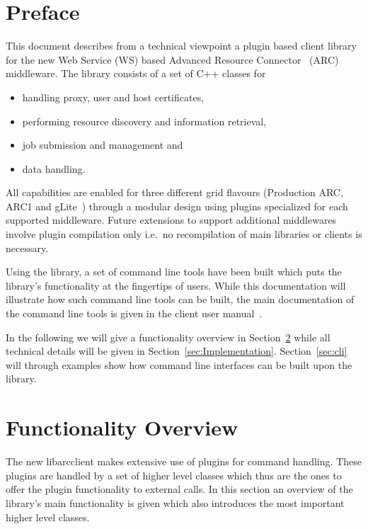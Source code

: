\documentclass{book}
\newcommand{\arclib}{libarcclient}
\begin{document}
\tableofcontents                   %
\newpage
\chapter{Preface}
\label{sec:intro}

This document describes from a technical viewpoint a plugin based
client library for the new Web Service (WS) based Advanced Resource
Connector~\cite{arc} (ARC) middleware. The library consists of a set
of C++ classes for

\begin{itemize}
\item{handling proxy, user and host certificates,}
\item{performing resource discovery and information retrieval,}
\item{job submission and management and}
\item{data handling.}
\end{itemize}

All capabilities are enabled for three different grid flavours
(Production ARC, ARC1 and gLite~\cite{glite}) through a modular design
using plugins specialized for each supported middleware. Future
extensions to support additional middlewares involve plugin
compilation only i.e.\ no recompilation of main libraries or clients
is necessary.

Using the library, a set of command line tools have been built which
puts the library's functionality at the fingertips of users. While
this documentation will illustrate how such command line tools can be
built, the main documentation of the command line tools is given in
the client user manual~\cite{ui}.

In the following we will give a functionality overview in
Section~\ref{sec:FuncOver} while all technical details will be given
in Section~\ref{sec:Implementation}. Section~\ref{sec:cli} will
through examples show how command line interfaces can be built upon
the library.

\chapter{Functionality Overview}
\label{sec:FuncOver}

The new {\arclib} makes extensive use of plugins for command
handling. These plugins are handled by a set of higher level classes
which thus are the ones to offer the plugin functionality to external
calls. In this section an overview of the library's main functionality
is given which also introduces the most important higher level
classes.
\end{document}
